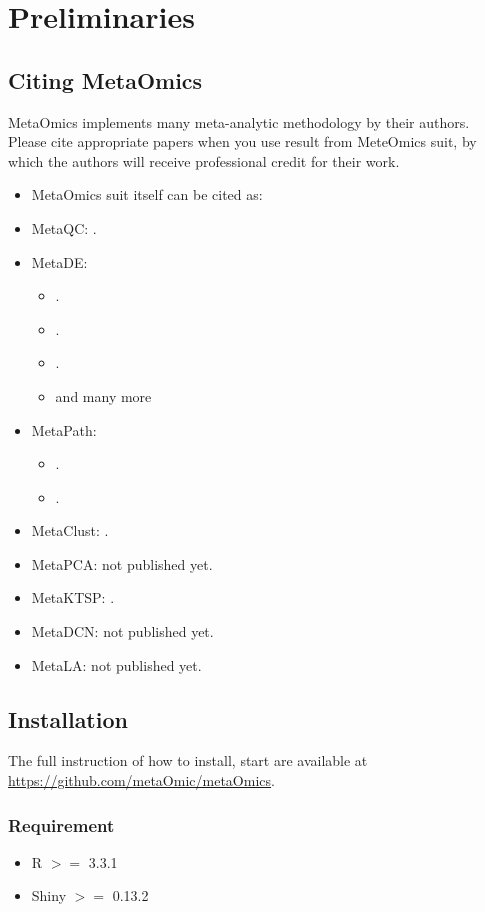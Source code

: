 \section{Preliminaries}
\subsection{Citing MetaOmics}
MetaOmics implements many meta-analytic methodology by their authors. 
Please cite appropriate papers when you use result from MeteOmics suit,
by which the authors will receive professional credit for their work.

\begin{itemize}
\item MetaOmics suit itself can be cited as:
\item MetaQC: .
\item MetaDE: 
\begin{itemize}
\item {}.
\item {}.
\item {}.
\item and many more
\end{itemize}
\item MetaPath: 
\begin{itemize}
\item {}.
\item {}.
\end{itemize}
\item MetaClust: .
\item MetaPCA: not published yet.
\item MetaKTSP: .
\item MetaDCN: not published yet.
\item MetaLA: not published yet.
\end{itemize}



\subsection{Installation}
The full instruction of how to install, start are available at \url{https://github.com/metaOmic/metaOmics}.
\subsubsection{Requirement}
\begin{itemize}
\item R $>=$ 3.3.1
\item Shiny $>=$ 0.13.2
\end{itemize}


